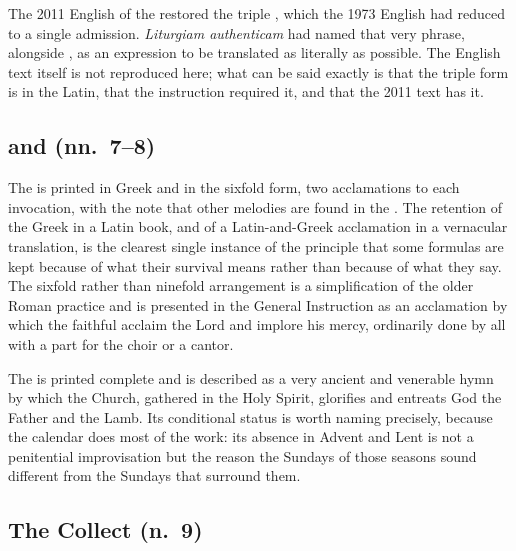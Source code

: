 The 2011 English of the  restored the triple , which the 1973
English had reduced to a single admission. \emph{Liturgiam authenticam} had named that very
phrase, alongside , as an expression to be translated as literally as
possible. The English text itself is not reproduced here; what can be said exactly is that the
triple form is in the Latin, that the instruction required it, and that the 2011 text has it.

\subsection{ and  (nn.\ 7--8)}

The  is printed in Greek and in the sixfold form, two acclamations to each
invocation, with the note that other melodies are found in the . The retention of the Greek in a Latin book, and of a Latin-and-Greek
acclamation in a vernacular translation, is the clearest single instance of the principle that
some formulas are kept because of what their survival means rather than because of what they
say. The sixfold rather than ninefold arrangement is a simplification of the older Roman
practice and is presented in the General Instruction as an acclamation by which the faithful
acclaim the Lord and implore his mercy, ordinarily done by all with a part for the choir or a
cantor.

The  is printed complete and is described as a very ancient and venerable hymn by
which the Church, gathered in the Holy Spirit, glorifies and entreats God the Father and the
Lamb. Its conditional status is worth naming precisely, because the calendar does most of the
work: its absence in Advent and Lent is not a penitential improvisation but the reason the
Sundays of those seasons sound different from the Sundays that surround them.

\subsection{The Collect (n.\ 9)}


